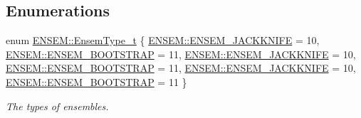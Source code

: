 \subsection*{Enumerations}
\begin{DoxyCompactItemize}
\item 
enum \mbox{\hyperlink{namespaceENSEM_a2dc2c4a26884f343471e52f23479ddbe}{E\+N\+S\+E\+M\+::\+Ensem\+Type\+\_\+t}} \{ \newline
\mbox{\hyperlink{namespaceENSEM_a2dc2c4a26884f343471e52f23479ddbea8aa9c7338ce9385f7614ac37c0977b0c}{E\+N\+S\+E\+M\+::\+E\+N\+S\+E\+M\+\_\+\+J\+A\+C\+K\+K\+N\+I\+FE}} = 10, 
\mbox{\hyperlink{namespaceENSEM_a2dc2c4a26884f343471e52f23479ddbea3c46f96ff58ab0b92731bd7ae20276ef}{E\+N\+S\+E\+M\+::\+E\+N\+S\+E\+M\+\_\+\+B\+O\+O\+T\+S\+T\+R\+AP}} = 11, 
\mbox{\hyperlink{namespaceENSEM_a2dc2c4a26884f343471e52f23479ddbea8aa9c7338ce9385f7614ac37c0977b0c}{E\+N\+S\+E\+M\+::\+E\+N\+S\+E\+M\+\_\+\+J\+A\+C\+K\+K\+N\+I\+FE}} = 10, 
\mbox{\hyperlink{namespaceENSEM_a2dc2c4a26884f343471e52f23479ddbea3c46f96ff58ab0b92731bd7ae20276ef}{E\+N\+S\+E\+M\+::\+E\+N\+S\+E\+M\+\_\+\+B\+O\+O\+T\+S\+T\+R\+AP}} = 11, 
\newline
\mbox{\hyperlink{namespaceENSEM_a2dc2c4a26884f343471e52f23479ddbea8aa9c7338ce9385f7614ac37c0977b0c}{E\+N\+S\+E\+M\+::\+E\+N\+S\+E\+M\+\_\+\+J\+A\+C\+K\+K\+N\+I\+FE}} = 10, 
\mbox{\hyperlink{namespaceENSEM_a2dc2c4a26884f343471e52f23479ddbea3c46f96ff58ab0b92731bd7ae20276ef}{E\+N\+S\+E\+M\+::\+E\+N\+S\+E\+M\+\_\+\+B\+O\+O\+T\+S\+T\+R\+AP}} = 11
 \}
\begin{DoxyCompactList}\small\item\em The types of ensembles. \end{DoxyCompactList}\end{DoxyCompactItemize}
